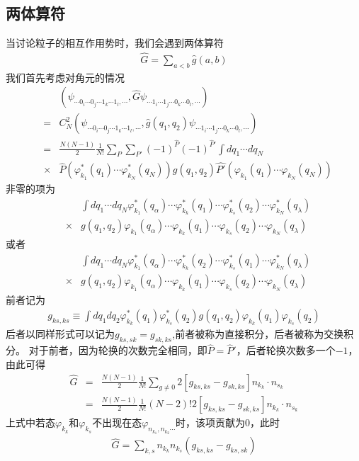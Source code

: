 \documentclass[12pt, a4paper, oneside, UTF8]{ctexbook}
\begin{document}
\subsection{两体算符}
当讨论粒子的相互作用势时，我们会遇到两体算符
\begin{eqnarray}
    \hat{G}=\sum_{a<b}\hat{g}(a,b)
\end{eqnarray}
我们首先考虑对角元的情况
\begin{eqnarray}
    &&(\psi_{\cdots 0_i\cdots 0_j \cdots 1_k \cdots 1_l,\cdots},\hat{G}\psi_{\cdots 1_i\cdots 1_j \cdots 0_k \cdots 0_l,\cdots})\\\nonumber
    &=&C_N^2(\psi_{\cdots 0_i\cdots 0_j \cdots 1_k \cdots 1_l,\cdots},\hat{g}(q_1,q_2)\psi_{\cdots 1_i\cdots 1_j \cdots 0_k \cdots 0_l,\cdots})\\\nonumber
    &=&\frac{N(N-1)}{2}\frac{1}{N!}\sum_P\sum_{P'}(-1)^{\hat{P}}(-1)^{\hat{P}'}\int dq_1 \cdots dq_N\\\nonumber
    &\times&\hat{P}\left(\varphi^*_{k_1}(q_1)\cdots\varphi^*_{k_N}(q_N)\right)
    g(q_1,q_2)\hat{P'}\left(\varphi_{k_1}(q_1)\cdots\varphi_{k_N}(q_N)\right)
\end{eqnarray}
非零的项为
\begin{eqnarray}
    &&\int dq_1\cdots dq_N \varphi^*_{k_1}(q_\alpha)\cdots\varphi^*_{k_k}(q_1)\cdots\varphi^*_{k_s}(q_2)\cdots\varphi^*_{k_N}(q_\lambda)\\\nonumber
    &\times& g(q_1,q_2)\varphi_{k_1}(q_\alpha)\cdots\varphi_{k_k}(q_1)\cdots\varphi_{k_s}(q_2)\cdots\varphi_{k_N}(q_\lambda)
\end{eqnarray}
或者
\begin{eqnarray}
    &&\int dq_1\cdots dq_N \varphi^*_{k_1}(q_\alpha)\cdots\varphi^*_{k_k}(q_2)\cdots\varphi^*_{k_s}(q_1)\cdots\varphi^*_{k_N}(q_\lambda)\\\nonumber
    &\times& g(q_1,q_2)\varphi_{k_1}(q_\alpha)\cdots\varphi_{k_k}(q_1)\cdots\varphi_{k_s}(q_2)\cdots\varphi_{k_N}(q_\lambda)
\end{eqnarray}
前者记为
\begin{eqnarray}
    g_{ks,ks}\equiv\int dq_1dq_2\varphi^*_{k_k}(q_1)\varphi^*_{k_s}(q_2)g(q_1,q_2)\varphi_{k_k}(q_1)\varphi_{k_s}(q_2)
\end{eqnarray}
后者以同样形式可以记为$g_{ks,sk}=g_{sk,ks}$,前者被称为直接积分，后者被称为交换积分。
对于前者，因为轮换的次数完全相同，即$\hat{P}=\hat{P}'$，后者轮换次数多一个$-1$，由此可得
\begin{eqnarray}
    \hat{G}&=&\frac{N(N-1)}{2}\frac{1}{N!}\sum_{g\neq 0}2[g_{ks,ks}-g_{sk,ks}]n_{k_k}\cdot n_{s_k}\\\nonumber
    &=&\frac{N(N-1)}{2}\frac{1}{N!}(N-2)! 2[g_{ks,ks}-g_{sk,ks}]n_{k_k}\cdot n_{s_k}
\end{eqnarray}
上式中若态$\varphi_{k_k}$和$\varphi_{k_s}$不出现在态$\varphi_{n_{k_1},n_{k_2}\cdots}$时，该项贡献为0，此时
\begin{eqnarray}
    \hat{G}=\sum_{k,s}n_{k_k}n_{k_s}(g_{ks,ks}-g_{ks,sk})
\end{eqnarray}
\end{document}
